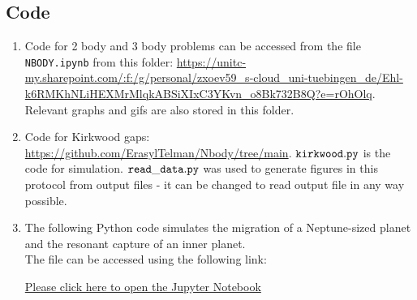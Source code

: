 \documentclass[12pt,a4paper]{article}
\begin{document}
\subsection{Code}
\label{sec:code}
\begin{enumerate}
  \item Code for 2 body and 3 body problems can be accessed from the file \texttt{NBODY.ipynb} from this folder: \url{https://unitc-my.sharepoint.com/:f:/g/personal/zxoev59_s-cloud_uni-tuebingen_de/Ehl-k6RMKhNLiHEXMrMlqkABSiXIxC3YKvn_o8Bk732B8Q?e=rOhOlq}. 
  Relevant graphs and gifs are also stored in this folder.
  \item Code for Kirkwood gaps: \url{https://github.com/ErasylTelman/Nbody/tree/main}. $\tt kirkwood.py$ is the code for simulation. $\tt read\_data.py$ was used to generate figures in this protocol from output files - it can be changed to read output file in any way possible.
  \item The following Python code simulates the migration of a Neptune-sized planet and the resonant capture of an inner planet. 
  \\ The file can be accessed using the following link:
  
  \href{https://github.com/PratyushSingh09/Astro-Lab/blob/main/N%20Body/Resonant-Capture.ipynb}{Please click here to open the Jupyter Notebook}
\end{enumerate}
\end{document}

